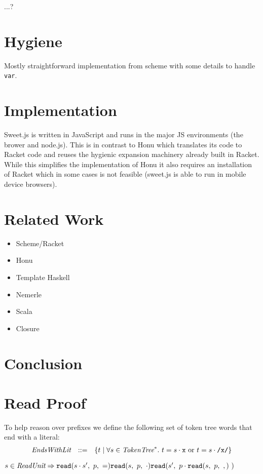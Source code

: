 \documentclass[preprint,10pt]{sigplanconf}
\begin{document}
...?

\section{Hygiene}
\label{sec-5}

Mostly straightforward implementation from scheme with some details to
handle \texttt{var}.
\section{Implementation}
\label{sec-6}
Sweet.js is written in JavaScript and runs in the major JS
environments (\ie the brower and node.js). This is in contrast to Honu
which translates its code to Racket code and reuses the hygienic
expansion machinery already built in Racket. While this simplifies
the implementation of Honu it also requires an installation of Racket
which in some cases is not feasible (\eg sweet.js is able to run in
mobile device browsers).
\section{Related Work}
\label{sec-7}

\begin{itemize}
\item Scheme/Racket
\item Honu
\item Template Haskell
\item Nemerle
\item Scala
\item Closure
\end{itemize}
\section{Conclusion}
\label{sec-8}

\appendix

\section{Read Proof}

To help reason over prefixes we define the following set of token tree
words that end with a literal:
\[
\begin{array}{rcl}
\textit{EndsWithLit} &::=& \{t \mid \forall s \in \textit{TokenTree}^{*}.~t = s \cdot \texttt{x}
~\textrm{or}~ t = s \cdot \texttt{/x/} \}
\end{array}
\]

\begin{lemma}
  \( s \in \textit{ReadUnit} \Rightarrow \readfn{s\cdot s'}{p} = 
  \readfn{s}{p} \cdot \readfn{s'}{p \cdot \readfn{s}{p}}\) 
\end{lemma}
\end{document}
